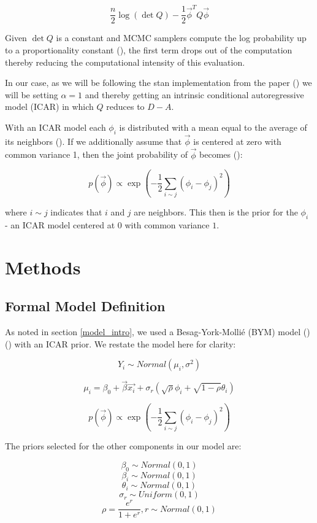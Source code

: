 \documentclass[11pt]{article}
\begin{document}
$$\frac{n}{2}\log{(\det{Q})}-\frac{1}{2}\vec{\phi}^T Q \vec{\phi}$$

Given $\det{Q}$ is a constant and MCMC samplers compute the log probability up to a proportionality constant (\cite{bymstan}), the first term drops out of the computation thereby reducing the computational intensity of this evaluation. 

In our case, as we will be following the stan implementation from the paper (\cite{bymstan}) we will be setting $\alpha=1$ and thereby getting an intrinsic conditional autoregressive model (ICAR) in which $Q$ reduces to $D-A$. 

With an ICAR model each $\phi_i$ is distributed with a mean equal to the average of its neighbors (\cite{bymstan}). If we additionally assume that $\vec{\phi}$ is centered at zero with common variance 1, then the joint probability of $\vec{\phi}$ becomes (\cite{bymstan}):

$$p(\vec{\phi})\propto \exp{\left( -\frac{1}{2} \sum_{i\sim j} (\phi_i - \phi_j)^2 \right)}$$

where $i \sim j$ indicates that $i$ and $j$ are neighbors. This then is the prior for the $\phi_i$ - an ICAR model centered at $0$ with common variance $1$. 

\newpage

\section{Methods}

\subsection{Formal Model Definition}

As noted in section \ref{model_intro}, we used a Besag-York-Mollié (BYM) model (\cite{book})(\cite{bymstan}) with an ICAR prior. We restate the model here for clarity: 

$$Y_i \sim Normal(\mu_i, \sigma^2)$$

$$\mu_i= \beta_0 + \vec{\beta} \vec{x_i} + \sigma_r\left( \sqrt{\rho}\phi_i + \sqrt{1-\rho}\theta_i \right)$$

$$p(\vec{\phi})\propto \exp{\left( -\frac{1}{2} \sum_{i\sim j} (\phi_i - \phi_j)^2 \right)}$$

The priors selected for the other components in our model are:

$$\beta_0 \sim Normal(0,1)$$
$$\beta_i \sim Normal(0,1)$$
$$\theta_i \sim Normal(0,1)$$
$$\sigma_r \sim Uniform(0,1)$$
$$\rho = \frac{e^{r}}{1 + e^{r}}, r\sim Normal(0,1)$$
\end{document}
